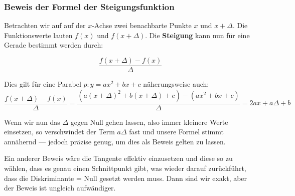 \subsubsection{Beweis der Formel der Steigungsfunktion}

Betrachten wir auf auf der $x$-Achse zwei benachbarte Punkte $x$ und
$x+\Delta$. Die Funktionswerte lauten $f(x)$ und $f(x+\Delta)$. Die
\textbf{Steigung} kann nun für eine Gerade bestimmt werden durch:


$$\frac{f(x+\Delta) - f(x)}{\Delta}$$

Dies gilt für eine Parabel $p: y=ax^2+bx+c$ näherungsweise auch:
$$\frac{f(x+\Delta)-f(x)}{\Delta} = \frac{(a(x+\Delta)^2 + b(x+\Delta)
  + c) - (ax^2 + bx +c)}{\Delta}=2ax+a\Delta+b$$

Wenn wir nun das $\Delta$ gegen Null gehen lassen, also immer kleinere
Werte einsetzen, so verschwindet der Term $a\Delta$ fast und unsere
Formel stimmt annähernd --- jedoch präzise genug, um dies als Beweis
gelten zu lassen.

Ein anderer Beweis wäre die Tangente effektiv einzusetzen und diese so
zu wählen, dass es genau einen Schnittpunkt gibt, was wieder darauf
zurückführt, dass die Diskriminante = Null gesetzt werden muss. Dann
sind wir exakt, aber der Beweis ist ungleich aufwändiger.
\newpage

